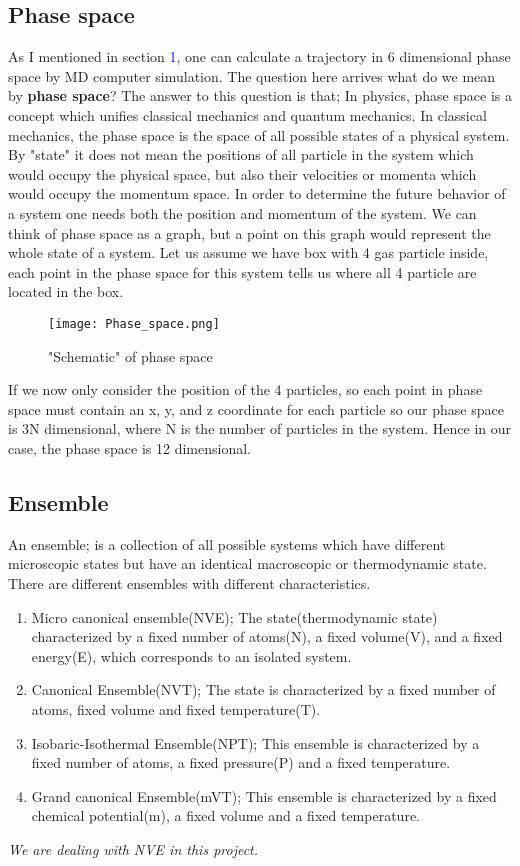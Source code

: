 \documentclass[a4paper]{article}
\begin{document}
\subsection{Phase space}
As I mentioned in section \textcolor{blue}{1}, one can calculate a trajectory in $6$ dimensional phase space by MD computer simulation. The question here arrives what do we mean by \textbf{phase space}? The answer to this question is that; In physics, phase space is a concept which unifies classical mechanics and quantum mechanics. In classical mechanics, the phase space is the space of all possible states of a physical system. By "state" it does not mean the positions of all particle in the system which would occupy the physical space, but also their velocities or momenta which would occupy the momentum space. In order to determine the future behavior of a system one needs both the position and momentum of the system. We can think of phase space as a graph, but a point on this graph would represent the whole state of a system. Let us assume we have box with 4 gas particle inside, each point in the phase space for this system tells us where all 4 particle are located in the box. 

\begin{figure}[!htbp]
\centering
\texttt{[image: Phase\_space.png]}
\caption{\label{fig:P_S} "Schematic" of phase space}
\end{figure}

If we now only consider the position of the 4 particles, so each point in phase space must contain an x, y, and z coordinate for each particle so our phase space is 3N dimensional, where N is the number of particles in the system. Hence in our case, the phase space is 12 dimensional. 

\subsection{Ensemble}
An ensemble; is a collection of all possible systems which have different microscopic states but have an identical macroscopic or thermodynamic state. There are different ensembles with different characteristics.
\begin{enumerate}
\item Micro canonical ensemble(NVE); The state(thermodynamic state) characterized by a fixed number of atoms(N), a fixed volume(V), and a fixed energy(E), which corresponds to an isolated system.
\item Canonical Ensemble(NVT); The state is characterized by a fixed number of atoms, fixed volume and fixed temperature(T). 
\item Isobaric-Isothermal Ensemble(NPT); This ensemble is characterized by a fixed number of atoms, a fixed pressure(P) and a fixed temperature.
\item Grand canonical Ensemble(mVT); This ensemble is characterized by a fixed chemical potential(m), a fixed volume and a fixed temperature. 
\end{enumerate}
\textsl{We are dealing with NVE in this project. }	
\end{document}
